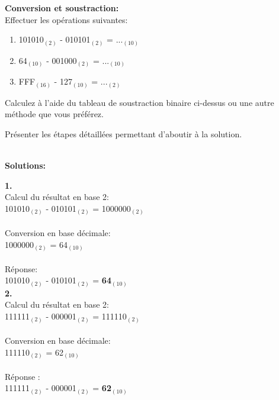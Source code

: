 \begin{Exercice}[20 minutes] \textbf{Conversion et soustraction:}\\
    Effectuer les opérations suivantes:
    \begin{enumerate}
        \item 101010$_{(2)}$ - 010101$_{(2)}$ = ...$_{(10)}$
        \item 64$_{(10)}$ - 001000$_{(2)}$ = ...$_{(10)}$
        \item FFF$_{(16)}$ - 127$_{(10)}$ = ...$_{(2)}$
    \end{enumerate}
    \begin{conseil}
            Calculez à l'aide du tableau de soustraction binaire ci-dessus ou une autre méthode que vous préférez.\\
    \end{conseil}
    \begin{solution}
        Présenter les étapes détaillées permettant d'aboutir à la solution.
    \end{solution}

    \textbf{\\ \faTerminal  Solutions:}
    
    \textbf{1.}\\
    Calcul du résultat en base 2:\\
    101010$_{(2)}$ - 010101$_{(2)}$ = 1000000$_{(2)}$\\\\
    Conversion en base décimale:\\
    1000000$_{(2)}$ = 64$_{(10)}$\\\\
    Réponse:\\
    101010$_{(2)}$ - 010101$_{(2)}$ = \textbf{64$_{(10)}$}\\
    
    \textbf{2.}\\
    Calcul du résultat en base 2:\\
    111111$_{(2)}$ - 000001$_{(2)}$ = 111110$_{(2)}$\\\\
    Conversion en base décimale:\\
    111110$_{(2)}$ = 62$_{(10)}$\\\\
    Réponse :\\
    111111$_{(2)}$ - 000001$_{(2)}$ = \textbf{62$_{(10)}$}\\


\end{Exercice}
